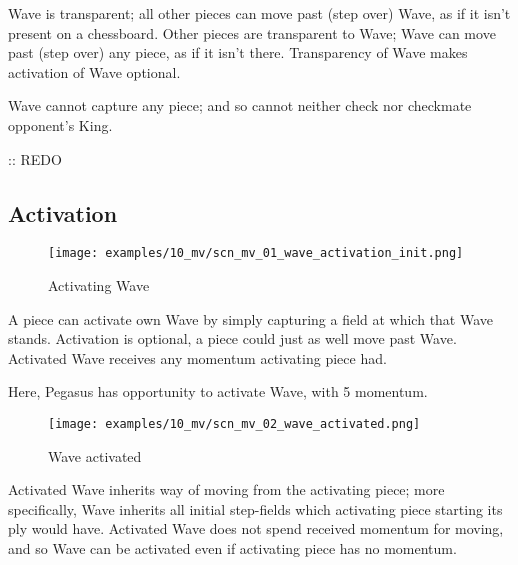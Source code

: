 Wave is transparent; all other pieces can move past (step over) Wave, as if it
isn't present on a chessboard. Other pieces are transparent to Wave; Wave can move
past (step over) any piece, as if it isn't there. Transparency of Wave makes
activation of Wave optional.

Wave cannot capture any piece; and so cannot neither check nor checkmate opponent's
King.

\TODO :: REDO

\clearpage %

\subsection*{Activation}
\label{sec:Miranda's veil/Wave/Activation}

\vspace*{-1.5\baselineskip}
\noindent
\begin{figure}[!h]
\texttt{[image: examples/10\_mv/scn\_mv\_01\_wave\_activation\_init.png]}
\vspace*{-1.4\baselineskip}
\caption{Activating Wave}
\label{fig:scn_mv_01_wave_activation_init}
\end{figure}

\vspace*{-0.5\baselineskip}
A piece can activate own Wave by simply capturing a field at which that Wave stands.
Activation is optional, a piece could just as well move past Wave. Activated Wave
receives any momentum activating piece had.

Here, Pegasus has opportunity to activate Wave, with 5 momentum.

\clearpage %

\vspace*{-2.1\baselineskip}
\noindent
\begin{figure}[!h]
\texttt{[image: examples/10\_mv/scn\_mv\_02\_wave\_activated.png]}
\vspace*{-1.4\baselineskip}
\caption{Wave activated}
\label{fig:scn_mv_02_wave_activated}
\end{figure}

\vspace*{-0.5\baselineskip}
Activated Wave inherits way of moving from the activating piece; more specifically,
Wave inherits all initial step-fields which activating piece starting its ply would
have. Activated Wave does not spend received momentum for moving, and so Wave can
be activated even if activating piece has no momentum.


